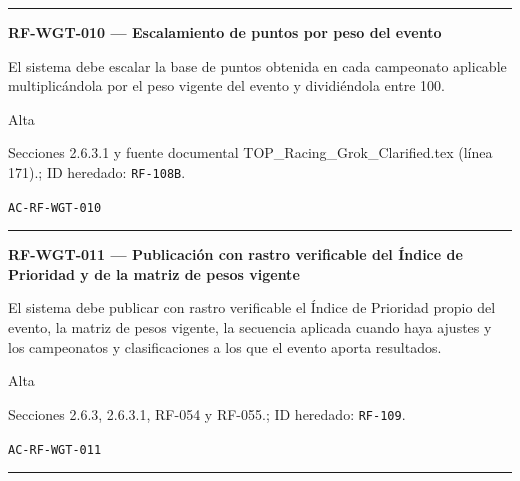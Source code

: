 \documentclass[10pt,letterpaper]{article}
\begin{document}
\vspace{0.25em}\hrule\vspace{0.65em}
\noindent\textbf{RF-WGT-010 --- Escalamiento de puntos por peso del evento}\par
\begin{description}[style=nextline,leftmargin=3.15cm,labelwidth=2.8cm,font=\normalfont\bfseries]
\item[Obligación] El sistema debe escalar la base de puntos obtenida en cada campeonato aplicable multiplicándola por el peso vigente del evento y dividiéndola entre 100.
\item[Prioridad] Alta
\item[Procedencia] Secciones 2.6.3.1 y fuente documental TOP\_Racing\_Grok\_Clarified.tex (línea 171).; ID heredado: \texttt{RF-108B}.
\item[Verificación] \texttt{AC-RF-WGT-010}
\end{description}
\vspace{0.25em}\hrule\vspace{0.65em}
\noindent\textbf{RF-WGT-011 --- Publicación con rastro verificable del Índice de Prioridad y de la matriz de pesos vigente}\par
\begin{description}[style=nextline,leftmargin=3.15cm,labelwidth=2.8cm,font=\normalfont\bfseries]
\item[Obligación] El sistema debe publicar con rastro verificable el Índice de Prioridad propio del evento, la matriz de pesos vigente, la secuencia aplicada cuando haya ajustes y los campeonatos y clasificaciones a los que el evento aporta resultados.
\item[Prioridad] Alta
\item[Procedencia] Secciones 2.6.3, 2.6.3.1, RF-054 y RF-055.; ID heredado: \texttt{RF-109}.
\item[Verificación] \texttt{AC-RF-WGT-011}
\end{description}
\vspace{0.25em}\hrule\vspace{0.65em}
\end{document}
